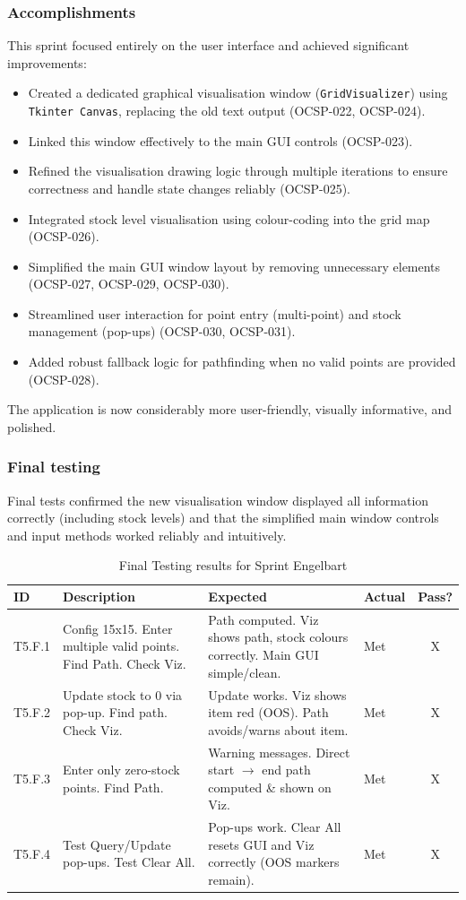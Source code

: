 \subsubsection{Accomplishments}
This sprint focused entirely on the user interface and achieved significant improvements:
\begin{itemize}
	\item Created a dedicated graphical visualisation window (\verb|GridVisualizer|) using \verb|Tkinter Canvas|, replacing the old text output (OCSP-022, OCSP-024).
	\item Linked this window effectively to the main GUI controls (OCSP-023).
	\item Refined the visualisation drawing logic through multiple iterations to ensure correctness and handle state changes reliably (OCSP-025).
	\item Integrated stock level visualisation using colour-coding into the grid map (OCSP-026).
	\item Simplified the main GUI window layout by removing unnecessary elements (OCSP-027, OCSP-029, OCSP-030).
	\item Streamlined user interaction for point entry (multi-point) and stock management (pop-ups) (OCSP-030, OCSP-031).
	\item Added robust fallback logic for pathfinding when no valid points are provided (OCSP-028).
\end{itemize}
The application is now considerably more user-friendly, visually informative, and polished.

\subsubsection{Final testing}
Final tests confirmed the new visualisation window displayed all information correctly (including stock levels) and that the simplified main window controls and input methods worked reliably and intuitively.

\begin{table}[htbp] %
	\centering
	\begin{tabularx}{\textwidth}{|l|X|p{3.5cm}|p{3.5cm}|c|}
		\hline
		\textbf{ID} & \textbf{Description} & \textbf{Expected} & \textbf{Actual} & \textbf{Pass?} \\
		\hline
		T5.F.1 & Config 15x15. Enter multiple valid points. Find Path. Check Viz. & Path computed. Viz shows path, stock colours correctly. Main GUI simple/clean. & Met & X \\
		\hline
		T5.F.2 & Update stock to 0 via pop-up. Find path. Check Viz. & Update works. Viz shows item red (OOS). Path avoids/warns about item. & Met & X \\
		\hline
		T5.F.3 & Enter only zero-stock points. Find Path. & Warning messages. Direct start $\rightarrow$ end path computed \& shown on Viz. & Met & X \\
		\hline
		T5.F.4 & Test Query/Update pop-ups. Test Clear All. & Pop-ups work. Clear All resets GUI and Viz correctly (OOS markers remain). & Met & X \\
		\hline
	\end{tabularx}
	\caption{Final Testing results for Sprint Engelbart}
\end{table}

